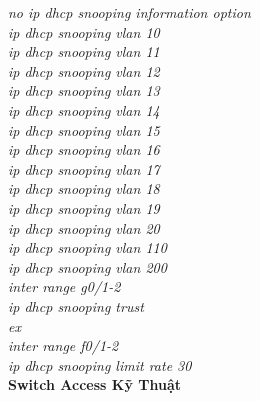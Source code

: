 \documentclass[12pt,a4paper]{report}
\begin{document}
\hspace*{2cm}\textit{no ip dhcp snooping information option\\
\hspace*{2cm}ip dhcp snooping vlan 10\\
\hspace*{2cm}ip dhcp snooping vlan 11\\
\hspace*{2cm}ip dhcp snooping vlan 12\\
\hspace*{2cm}ip dhcp snooping vlan 13\\
\hspace*{2cm}ip dhcp snooping vlan 14\\
\hspace*{2cm}ip dhcp snooping vlan 15\\
\hspace*{2cm}ip dhcp snooping vlan 16\\
\hspace*{2cm}ip dhcp snooping vlan 17\\
\hspace*{2cm}ip dhcp snooping vlan 18\\
\hspace*{2cm}ip dhcp snooping vlan 19\\
\hspace*{2cm}ip dhcp snooping vlan 20\\
\hspace*{2cm}ip dhcp snooping vlan 110\\
\hspace*{2cm}ip dhcp snooping vlan 200\\
\hspace*{2cm}inter range g0/1-2\\
\hspace*{2cm}ip dhcp snooping trust\\
\hspace*{2cm}ex\\
\hspace*{2cm}inter range f0/1-2\\
\hspace*{2cm}ip dhcp snooping limit rate 30\\}
\hspace*{1cm}\textbf{Switch Access Kỹ Thuật}\\
\end{document}

